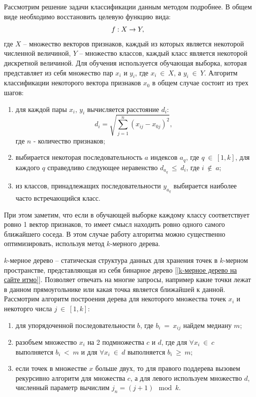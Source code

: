 \documentclass[14pt, a4paper]{extreport}
\begin{document}
	Рассмотрим решение задачи классификации данным методом подробнее. В общем виде необходимо восстановить целевую функцию вида:
	\vspace*{-0.5cm}
	\begin{equation*}
		f: X \rightarrow Y, 
		\label{KNNf}
		\vspace*{-0.5cm}
	\end{equation*}
	где $X$ -- множество векторов признаков, каждый из которых является некоторой численной величиной, $Y$ -- множество классов, каждый класс является некоторой дискретной величиной. Для обучения используется обучающая выборка, которая представляет из себя множество пар $x_i$ и $y_i$, где $x_i~\in~X$, а $y_i~\in~Y$.
	Алгоритм классификации некоторого вектора признаков $x_0$ в общем случае состоит из трех шагов:
	\begin{enumerate}[label={\arabic*)}]
		\item для каждой пары $x_i$, $y_i$ вычисляется расстояние $d_i$:
		\begin{equation*}
			d_i = \sqrt{\sum\limits_{j=1}^n (x_{ij} - x_{0j})^2}, 
			\label{disqrt}
		\end{equation*}
		где $n$ - количество признаков;
		\item выбирается некоторая последовательность $a$ индексов $a_q$, где \linebreak $q~\in~[1, k]$, для каждого $q$ справедливо следующее неравенство $d_{a_q}~\le~d_{i}$, где $i~\notin~a$;
		\item из классов, принадлежащих последовательности $y_{a_q}$ выбирается наиболее часто встречающийся класс.
	\end{enumerate}
	
	При этом заметим, что если в обучающей выборке каждому классу соответствует ровно 1 вектор признаков, то имеет смысл находить ровно одного самого ближайшего соседа.
	В этом случае работу алгоритма можно существенно оптимизировать, используя метод $k$-мерного дерева.
	
	$k$-мерное дерево -- статическая структура данных для хранения точек в $k$-мерном пространстве, представляющая из себя бинарное дерево [\ref{k-мерное дерево на сайте итмо}]. Позволяет отвечать на многие запросы, например какие точки лежат в данном прямоугольнике или какая точка является ближайшей к данной. Рассмотрим алгоритм построения дерева для некоторого множества точек $x_i$ и некоторго числа $j~\in~[1, k]$:
	\begin{enumerate}[label={\arabic*)}]
		\item для упорядоченной последовательности $b$, где $b_i~=~x_{ij}$ найдем медиану $m$;
		\item разобъем множество $x_i$ на 2 подмножества $c$ и $d$, где для $\forall x_i~\in~c$ выполняется $b_i~<~m$ и для $\forall x_i~\in~d$ выполняется $b_i~\ge~m$;
		\item если точек в множестве $x$ больше двух, то для правого поддерева вызовем рекурсивно алгоритм для множества $c$, а для левого используем множество $d$, численный параметр вычислим $j_{n}=(j + 1) \mod k$. 
	\end{enumerate}
	
\end{document}

